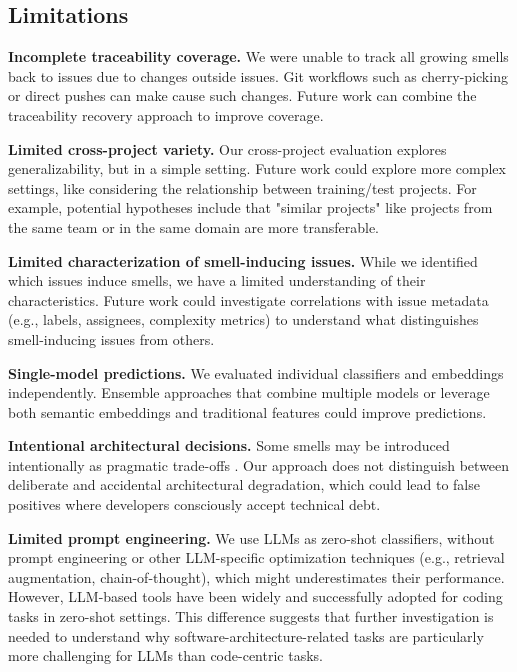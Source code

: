 \subsection{Limitations}

\textbf{Incomplete traceability coverage.}
We were unable to track all growing smells back to issues due to changes outside issues.
Git workflows such as cherry-picking or direct pushes can make cause such changes\cite{businge_reuse_2022}.
Future work can combine the traceability recovery approach\cite{businge_reuse_2022} to improve coverage.

\textbf{Limited cross-project variety.} 
Our cross-project evaluation explores generalizability, but in a simple setting.
Future work could explore more complex settings, like considering the relationship between training/test projects.
For example, potential hypotheses include that "similar projects" like projects from the same team or in the same domain are more transferable.



\textbf{Limited characterization of smell-inducing issues.}
While we identified which issues induce smells, we have a limited understanding of their characteristics.
Future work could investigate correlations with issue metadata (e.g., labels, assignees, complexity metrics) to understand what distinguishes smell-inducing issues from others.

\textbf{Single-model predictions.}
We evaluated individual classifiers and embeddings independently.
Ensemble approaches that combine multiple models or leverage both semantic embeddings and traditional features could improve predictions.

\textbf{Intentional architectural decisions.}
Some smells may be introduced intentionally as pragmatic trade-offs \cite{sas_investigating_2019}.
Our approach does not distinguish between deliberate and accidental architectural degradation, which could lead to false positives where developers consciously accept technical debt.

\textbf{Limited prompt engineering.}
We use \acp{LLM} as zero-shot classifiers, without prompt engineering or other LLM-specific optimization techniques (e.g., retrieval augmentation, chain-of-thought), which might underestimates their performance.
However, \ac{LLM}-based tools have been widely and successfully adopted for coding tasks in zero-shot settings.
This difference suggests that further investigation is needed to understand why software-architecture-related tasks are particularly more challenging for \acp{LLM} than code-centric tasks.